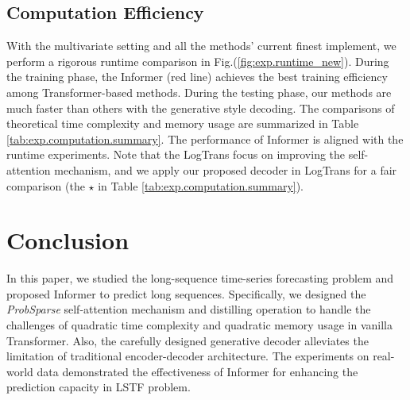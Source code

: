 \documentclass[letterpaper]{article} %
\newcommand{\mn}{Informer}
\begin{document}
\subsection{Computation Efficiency}
\label{sec:Exp.CompuationEfficiency}
With the multivariate setting and all the methods' current finest implement, we perform a rigorous runtime comparison in Fig.(\ref{fig:exp.runtime_new}). During the training phase, the {\mn} (red line) achieves the best training efficiency among Transformer-based methods. During the testing phase, our methods are much faster than others with the generative style decoding. The comparisons of theoretical time complexity and memory usage are summarized in Table \ref{tab:exp.computation.summary}. The performance of {\mn} is aligned with the runtime experiments. Note that the LogTrans focus on improving the self-attention mechanism, and we apply our proposed decoder in LogTrans for a fair comparison (the $\star$ in Table \ref{tab:exp.computation.summary}).


\section{Conclusion}
In this paper, we studied the long-sequence time-series forecasting problem and  proposed {\mn} to predict long sequences. Specifically, we designed the \emph{ProbSparse} self-attention mechanism and distilling operation to handle the challenges of quadratic time complexity and quadratic memory usage in vanilla Transformer. Also, the carefully designed generative decoder alleviates the limitation of traditional encoder-decoder architecture. The experiments on real-world data demonstrated the effectiveness of {\mn} for enhancing the prediction capacity in LSTF problem.
\end{document}
